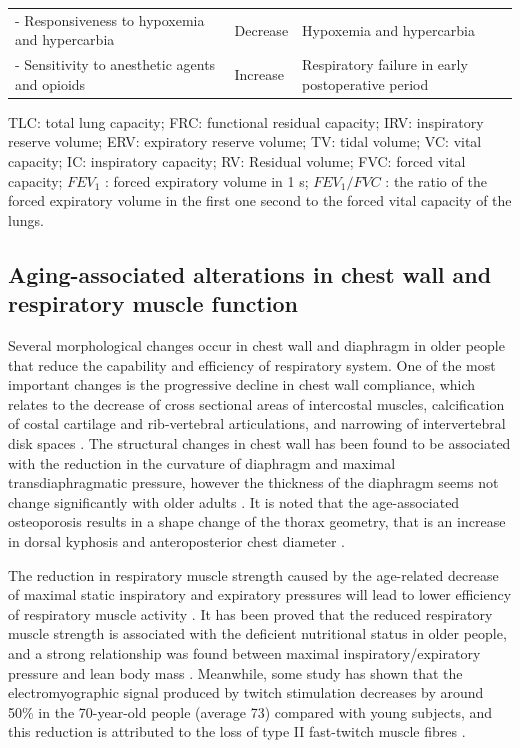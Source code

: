 \begin{table}[htbp]
\begin{tabular}{p{5.8cm} p{3.6cm} p{4.8cm}}
- Responsiveness to hypoxemia and hypercarbia & Decrease & Hypoxemia and hypercarbia\\
- Sensitivity to anesthetic agents and opioids & Increase & Respiratory failure in early postoperative period\\
\hline
\end{tabular}
\begin{tablenotes}
        \footnotesize
        \item{TLC: total lung capacity; FRC: functional residual capacity; IRV: inspiratory reserve volume; ERV: expiratory reserve volume; TV: tidal volume; VC: vital capacity; IC: inspiratory capacity; RV: Residual volume; FVC: forced vital capacity; $FEV_1$ : forced expiratory volume in 1 s; $FEV_1/FVC$ : the ratio of the forced expiratory volume in the first one second to the forced vital capacity of the lungs.}
\end{tablenotes}
\end{table}

\subsection{Aging-associated alterations in chest wall and respiratory muscle function} \label{ChestWallChange}
Several morphological changes occur in chest wall and diaphragm in older people that reduce the capability and efficiency of respiratory system. One of the most important changes is the progressive decline in chest wall compliance, which relates to the decrease of cross sectional areas of intercostal muscles, calcification of costal cartilage and rib-vertebral articulations, and narrowing of intervertebral disk spaces \citep{murray1986normal, crapo1993aging}. The structural changes in chest wall has been found to be associated with the reduction in the curvature of diaphragm and maximal transdiaphragmatic pressure, however the thickness of the diaphragm seems not change significantly with older adults \citep{zaugg2000respiratory, sprung2006age}. It is noted that the age-associated osteoporosis results in a shape change of the thorax geometry, that is an increase in dorsal kyphosis and anteroposterior chest diameter \citep{janssens1999physiological,sprung2006age}. 

The reduction in respiratory muscle strength caused by the age-related decrease of maximal static inspiratory and expiratory pressures will lead to lower efficiency of respiratory muscle activity \citep{wijesinghe2005effect,sprung2006age,lalley2013aging}. It has been proved that the reduced respiratory muscle strength is associated with the deficient nutritional status in older people, and a strong relationship was found between maximal inspiratory/expiratory pressure and lean body mass \citep{arora1982respiratory,janssens1999physiological}. Meanwhile, some study has shown that the electromyographic signal produced by twitch stimulation decreases by around 50\% in the 70-year-old people (average 73) compared with young subjects, and this reduction is attributed to the loss of type II fast-twitch muscle fibres \citep{larsson1983histochemical}. 

